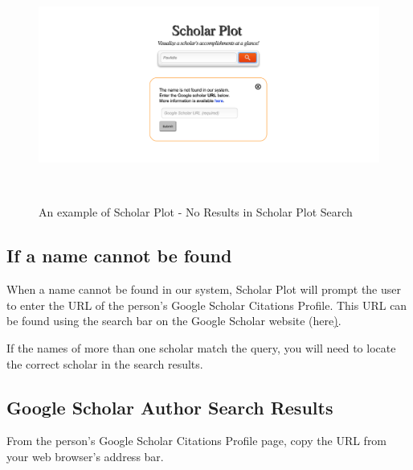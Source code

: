 \begin{figure}
  \centering
  \includegraphics[width=1\textwidth]{figures/Support-4}
  \caption{An example of Scholar Plot - No Results in Scholar Plot Search}~\label{fig:Support-4}
\end{figure}




\subsection{If a name cannot be found}
When a name cannot be found in our system, Scholar Plot will prompt the user to enter the URL of the person's Google Scholar Citations Profile. This URL can be found using the search bar on the Google Scholar website (here\href{https://scholar.google.com/citations?mauthors=&hl=en&view_op=search_authors}).

If the names of more than one scholar match the query, you will need to locate the correct scholar in the search results.



\subsection{Google Scholar Author Search Results}
From the person's Google Scholar Citations Profile page, copy the URL from your web browser's address bar.

